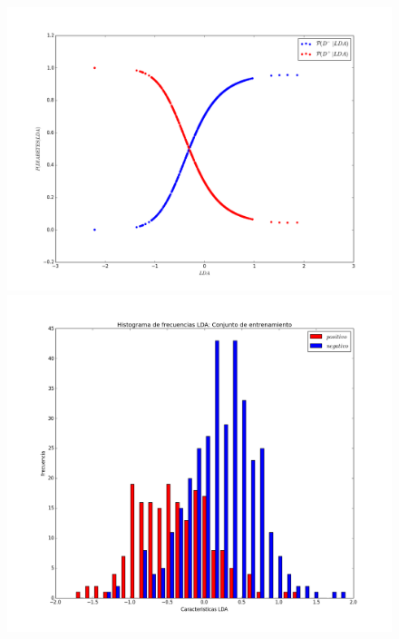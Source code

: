\documentclass[letter, titlepage, 10pt]{article}
\begin{document}
\begin{appendices}
  \begin{figure}[H]
  \centering
    \begin{minipage}{.5\textwidth}
        \centering
        \includegraphics[width=1\linewidth]{images/CP_D5}
    \end{minipage}%
    \begin{minipage}{.5\textwidth}
        \centering
        \includegraphics[width=1\linewidth]{images/Histograma_D6}
    \end{minipage}
\end{figure}


\end{appendices}
\end{document}

